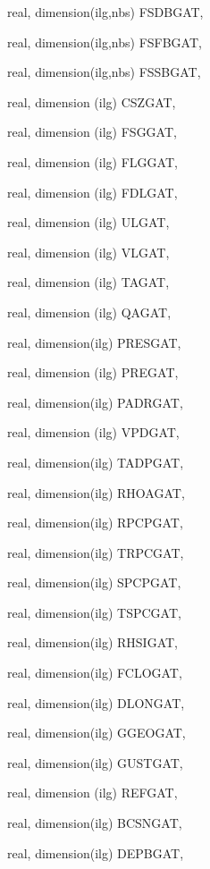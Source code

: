 {\begin{DoxyParamCaption}
\item[{real, dimension(ilg,nbs)}]{F\+S\+D\+B\+G\+A\+T, }
\item[{real, dimension(ilg,nbs)}]{F\+S\+F\+B\+G\+A\+T, }
\item[{real, dimension(ilg,nbs)}]{F\+S\+S\+B\+G\+A\+T, }
\item[{real, dimension (ilg)}]{C\+S\+Z\+G\+A\+T, }
\item[{real, dimension (ilg)}]{F\+S\+G\+G\+A\+T, }
\item[{real, dimension (ilg)}]{F\+L\+G\+G\+A\+T, }
\item[{real, dimension (ilg)}]{F\+D\+L\+G\+A\+T, }
\item[{real, dimension  (ilg)}]{U\+L\+G\+A\+T, }
\item[{real, dimension  (ilg)}]{V\+L\+G\+A\+T, }
\item[{real, dimension  (ilg)}]{T\+A\+G\+A\+T, }
\item[{real, dimension  (ilg)}]{Q\+A\+G\+A\+T, }
\item[{real, dimension(ilg)}]{P\+R\+E\+S\+G\+A\+T, }
\item[{real, dimension (ilg)}]{P\+R\+E\+G\+A\+T, }
\item[{real, dimension(ilg)}]{P\+A\+D\+R\+G\+A\+T, }
\item[{real, dimension (ilg)}]{V\+P\+D\+G\+A\+T, }
\item[{real, dimension(ilg)}]{T\+A\+D\+P\+G\+A\+T, }
\item[{real, dimension(ilg)}]{R\+H\+O\+A\+G\+A\+T, }
\item[{real, dimension(ilg)}]{R\+P\+C\+P\+G\+A\+T, }
\item[{real, dimension(ilg)}]{T\+R\+P\+C\+G\+A\+T, }
\item[{real, dimension(ilg)}]{S\+P\+C\+P\+G\+A\+T, }
\item[{real, dimension(ilg)}]{T\+S\+P\+C\+G\+A\+T, }
\item[{real, dimension(ilg)}]{R\+H\+S\+I\+G\+A\+T, }
\item[{real, dimension(ilg)}]{F\+C\+L\+O\+G\+A\+T, }
\item[{real, dimension(ilg)}]{D\+L\+O\+N\+G\+A\+T, }
\item[{real, dimension(ilg)}]{G\+G\+E\+O\+G\+A\+T, }
\item[{real, dimension(ilg)}]{G\+U\+S\+T\+G\+A\+T, }
\item[{real, dimension (ilg)}]{R\+E\+F\+G\+A\+T, }
\item[{real, dimension(ilg)}]{B\+C\+S\+N\+G\+A\+T, }
\item[{real, dimension(ilg)}]{D\+E\+P\+B\+G\+A\+T, }

\end{DoxyParamCaption}}
